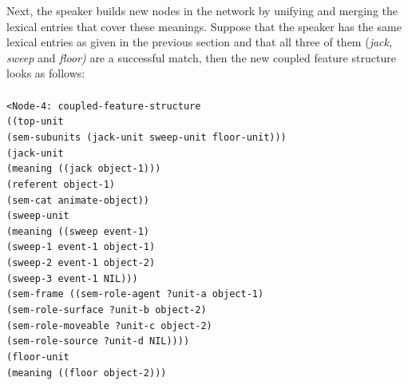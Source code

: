 Next, the speaker builds new nodes in the network by unifying and merging the lexical entries that cover these meanings. Suppose that the speaker has the same lexical entries as given in the previous section and that all three of them ({\em jack, sweep} and {\em floor)} are a successful match, then the new coupled feature structure looks as follows:
\\
\\
{\footnotesize{\tt <Node-4: coupled-feature-structure
\\ ((top-unit
\\ \hspace*{5mm} (sem-subunits (jack-unit sweep-unit floor-unit)))
\\ \hspace*{2mm}(jack-unit
\\ \hspace*{5mm} (meaning ((jack object-1)))
\\ \hspace*{5mm} (referent object-1)
\\ \hspace*{5mm} (sem-cat animate-object))
\\ \hspace*{2mm}(sweep-unit
\\ \hspace*{5mm} (meaning ((sweep event-1)
\\ \hspace*{27mm}(sweep-1 event-1 object-1)
\\ \hspace*{27mm}(sweep-2 event-1 object-2)
\\ \hspace*{27mm}(sweep-3 event-1 NIL)))
\\ \hspace*{5mm} (sem-frame ((sem-role-agent ?unit-a object-1)
\\ \hspace*{30mm}(sem-role-surface ?unit-b object-2)
\\ \hspace*{30mm}(sem-role-moveable ?unit-c object-2)
\\ \hspace*{30mm}(sem-role-source ?unit-d NIL))))
\\ \hspace*{2mm}(floor-unit
\\ \hspace*{5mm} (meaning ((floor object-2)))
}}
